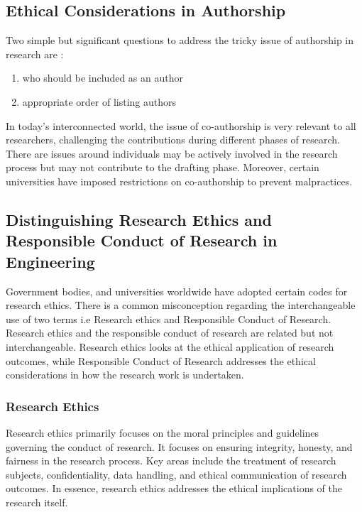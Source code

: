\documentclass{article}
\begin{document}
	\subsection{Ethical Considerations in Authorship}
	Two simple but significant questions to address the tricky issue of authorship in research are :

	\begin{enumerate}[label=\roman*)]
		\item who should be included as an author
		\item appropriate order of listing authors
	\end{enumerate}

	\noindent In today's interconnected world, the issue of co-authorship is very relevant to all researchers,
	challenging the contributions during different phases of research.
	There are issues around individuals may be actively involved in the research process but may not contribute
	to the drafting phase.
	Moreover, certain universities have imposed restrictions on co-authorship to prevent malpractices.

	\subsection{Distinguishing Research Ethics and Responsible Conduct of Research in Engineering}
	Government bodies, and universities worldwide have adopted certain codes for research ethics.
	There is a common misconception regarding the interchangeable use of two terms i.e Research ethics and
	Responsible Conduct of Research.
	Research ethics and the responsible conduct of research are related but not interchangeable.
	Research ethics looks at the ethical application of research outcomes, while Responsible Conduct of
	Research addresses the ethical considerations in how the research work is undertaken.

	\subsubsection{Research Ethics}
	Research ethics primarily focuses on the moral principles and guidelines governing the conduct of research.
	It focuses on ensuring integrity, honesty, and fairness in the research process.
	Key areas include the treatment of research subjects, confidentiality, data handling, and ethical
	communication of research outcomes.
	In essence, research ethics addresses the ethical implications of the research itself.
\end{document}
